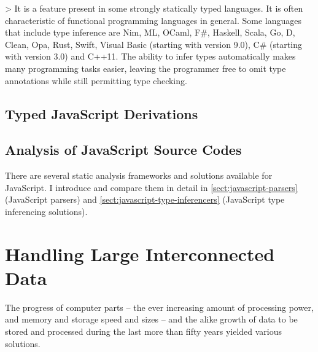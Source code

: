 > It is a feature present in some strongly statically typed languages. It is often characteristic of functional programming languages in general. Some languages that include type inference are Nim, ML, OCaml, F\#, Haskell, Scala, Go, D, Clean, Opa, Rust, Swift, Visual Basic (starting with version 9.0), C\# (starting with version 3.0) and C++11. The ability to infer types automatically makes many programming tasks easier, leaving the programmer free to omit type annotations while still permitting type checking.


\subsection{Typed JavaScript Derivations}

\subsection{Analysis of JavaScript Source Codes}
There are several static analysis frameworks and solutions available for JavaScript. I introduce and compare them in detail in \cref{sect:javascript-parsers} (JavaScript parsers) and \cref{sect:javascript-type-inferencers} (JavaScript type inferencing solutions).


\section{Handling Large Interconnected Data}
The progress of computer parts -- the ever increasing amount of processing power, and memory and storage speed and sizes -- and the alike growth of data to be stored and processed during the last more than fifty years yielded various solutions.


